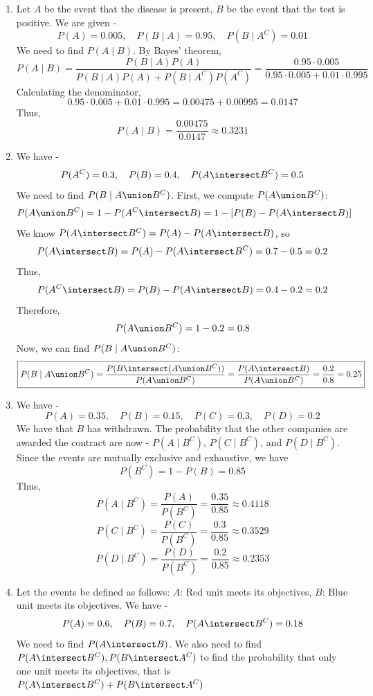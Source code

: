 \chapter{}
\begin{enumerate}
    \item Let $A$ be the event that the disease is present, $B$ be the event that the test is positive. We are given - 
    $$P(A) = 0.005, \quad P(B\mid A) = 0.95, \quad P(B\mid A^C) = 0.01$$
    We need to find $P(A\mid B)$. By Bayes' theorem,
    \[
    P(A\mid B)=\frac{P(B\mid A)P(A)}{P(B\mid A)P(A)+P(B\mid A^C)P(A^C)}=\frac{0.95\cdot 0.005}{0.95\cdot 0.005 + 0.01\cdot 0.995}
    \]
    Calculating the denominator,
    \[0.95\cdot 0.005 + 0.01\cdot 0.995 = 0.00475 + 0.00995 = 0.0147
    \]
    Thus,
    \[\boxed{P(A\mid B)=\frac{0.00475}{0.0147}\approx 0.3231}
    \]
    \item We have - 
    $$P(A^C) = 0.3, \quad P(B) = 0.4, \quad P(A \intersect B^C) = 0.5$$
    We need to find $P(B\mid A \union B^C)$. First, we compute $P(A \union B^C)$:
    \[P(A \union B^C) = 1 - P(A^C \intersect B) = 1 - [P(B) - P(A \intersect B)]\]
    We know $P(A \intersect B^C) = P(A) - P(A \intersect B)$, so
    \[P(A \intersect B) = P(A) - P(A \intersect B^C) = 0.7 - 0.5 = 0.2\]
    Thus,
    \[P(A^C \intersect B) = P(B) - P(A \intersect B) = 0.4 - 0.2 = 0.2\]
    Therefore,
    \[P(A \union B^C) = 1 - 0.2 = 0.8\]
    Now, we can find $P(B\mid A \union B^C)$:
    \[\boxed{
    P(B\mid A \union B^C) = \frac{P(B \intersect (A \union B^C))}{P(A \union B^C)} = \frac{P(A \intersect B)}{P(A \union B^C)} = \frac{0.2}{0.8} = 0.25}
    \]
    \item We have - 
    $$P(A) = 0.35, \quad P(B) = 0.15, \quad P(C) = 0.3, \quad P(D) = 0.2$$
    We have that $B$ has withdrawn. The probability that the other companies are awarded the contract are now - $P(A\mid B^C)$, $P(C\mid B^C)$, and $P(D\mid B^C)$. Since the events are mutually exclusive and exhaustive, we have
    \[P(B^C) = 1 - P(B) = 0.85
    \]
    Thus,
    \[\boxed{
    P(A\mid B^C) = \frac{P(A)}{P(B^C)} = \frac{0.35}{0.85} \approx 0.4118}
    \]
    \[\boxed{
    P(C\mid B^C) = \frac{P(C)}{P(B^C)} = \frac{0.3}{0.85} \approx 0.3529
    }\]
    \[\boxed{
    P(D\mid B^C) = \frac{P(D)}{P(B^C)} = \frac{0.2}{0.85} \approx 0.2353
    }\]
    \item Let the events be defined as follows:
    $A$: Red unit meets its objectives, $B$: Blue unit meets its objectives. We have - 
    $$P(A) = 0.6, \quad P(B) = 0.7, \quad P(A \intersect B^C) = 0.18$$
    We need to find $P(A \intersect B)$. We also need to find $P(A \intersect B^C), P(B \intersect A^C)$ to find the probability that only one unit meets its objectives, that is $P(A \intersect B^C) + P(B \intersect A^C)$

\end{enumerate}
